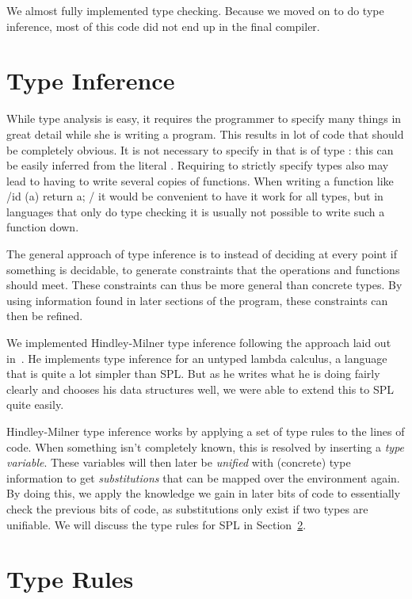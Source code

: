 We almost fully implemented type checking.
Because we moved on to do type inference, most of this code did not end up in the final compiler.

\section{Type Inference}

While type analysis is easy, it requires the programmer to specify many things in great detail while she is writing a program.
This results in lot of code that should be completely obvious.
It is not necessary to specify in  that  is of type : this can be easily inferred from the literal .
Requiring to strictly specify types also may lead to having to write several copies of functions.
When writing a function like \spl/id (a) { return a; }/ it would be convenient to have it work for all types, but in languages that only do type checking it is usually not possible to write such a function down.

The general approach of type inference is to instead of deciding at every point if something is decidable, to generate constraints that the operations and functions should meet.
These constraints can thus be more general than concrete types.
By using information found in later sections of the program, these constraints can then be refined.

We implemented Hindley-Milner type inference following the approach laid out in~\cite{writeyouahaskelltypeinf}.
He implements type inference for an untyped lambda calculus, a language that is quite a lot simpler than SPL\@.
But as he writes what he is doing fairly clearly and chooses his data structures well, we were able to extend this to SPL quite easily.

Hindley-Milner type inference works by applying a set of type rules to the lines of code.
When something isn't completely known, this is resolved by inserting a \emph{type variable}.
These variables will then later be \emph{unified} with (concrete) type information to get \emph{substitutions} that can be mapped over the environment again.
By doing this, we apply the knowledge we gain in later bits of code to essentially check the previous bits of code, as substitutions only exist if two types are unifiable.
We will discuss the type rules for SPL in Section~\ref{sec:typerules}.

\section{Type Rules}\label{sec:typerules}

